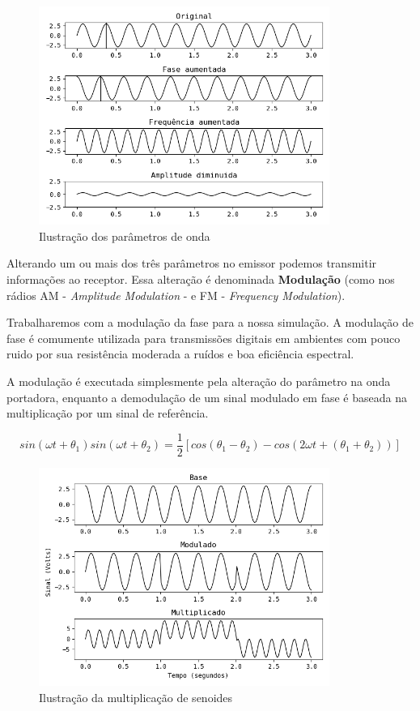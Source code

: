 \documentclass[titlepage,twocolumn]{article}
\begin{document}
\begin{figure}[H]
    \begin{center}
        \includegraphics[width=9.5cm]{imgs/onda_portadora.png}
        \caption{Ilustração dos parâmetros de onda}
        \label{fig:onda}
    \end{center}
\end{figure}

Alterando um ou mais dos três parâmetros no emissor podemos transmitir informações ao receptor. Essa alteração é denominada \textbf{Modulação} (como nos rádios AM - \textit{Amplitude Modulation} - e FM - \textit{Frequency Modulation}).

Trabalharemos com a modulação da fase para a nossa si\-mulação. A modulação de fase é comumente utilizada para transmissões digitais em ambientes com pouco ruido por sua resistência moderada a ruídos e boa eficiência espectral.

A modulação é executada simplesmente pela alteração do parâmetro na onda portadora, enquanto a demodulação de um sinal modulado em fase é baseada na multiplicação por um sinal de referência.

\begin{equation}
    \label{eq:multi}
        sin(\omega t+\theta_1)sin(\omega t+\theta_2) = \frac{1}{2}[cos(\theta_1-\theta_2) - cos(2\omega t+(\theta_1+\theta_2))]
\end{equation}

\begin{figure}[H]
    \begin{center}
        \includegraphics[width=9.5cm]{imgs/modulacao_fase.png}
        \caption{Ilustração da  multiplicação de senoides}
        \label{fig:demod}
    \end{center}
\end{figure}
\end{document}
